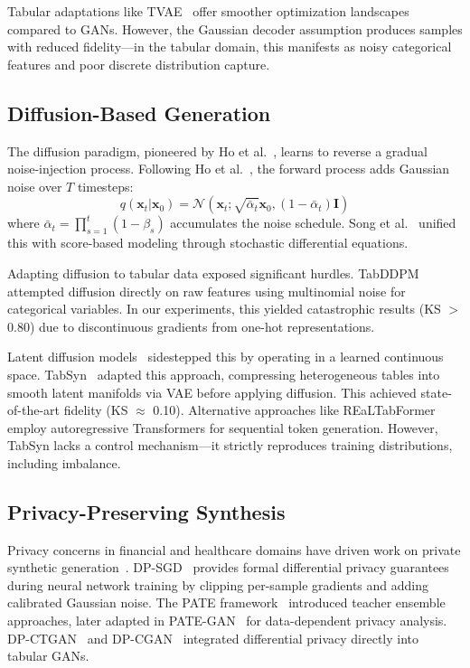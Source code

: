 \documentclass[conference]{IEEEtran}
\begin{document}
Tabular adaptations like TVAE~\cite{xu2019ctgan} offer smoother optimization landscapes compared to GANs. However, the Gaussian decoder assumption produces samples with reduced fidelity---in the tabular domain, this manifests as noisy categorical features and poor discrete distribution capture.

\subsection{Diffusion-Based Generation}
The diffusion paradigm, pioneered by Ho et al.~\cite{ho2020ddpm}, learns to reverse a gradual noise-injection process. Following Ho et al.~\cite{ho2020ddpm}, the forward process adds Gaussian noise over $T$ timesteps:
\begin{equation}
q(\mathbf{x}_t | \mathbf{x}_0) = \mathcal{N}(\mathbf{x}_t; \sqrt{\bar{\alpha}_t}\mathbf{x}_0, (1-\bar{\alpha}_t)\mathbf{I})
\end{equation}
where $\bar{\alpha}_t = \prod_{s=1}^t (1 - \beta_s)$ accumulates the noise schedule. Song et al.~\cite{song2021score} unified this with score-based modeling through stochastic differential equations.

Adapting diffusion to tabular data exposed significant hurdles. TabDDPM~\cite{kotelnikov2023tabddpm} attempted diffusion directly on raw features using multinomial noise for categorical variables. In our experiments, this yielded catastrophic results (KS $>$ 0.80) due to discontinuous gradients from one-hot representations.

Latent diffusion models~\cite{rombach2022ldm} sidestepped this by operating in a learned continuous space. TabSyn~\cite{zhang2024tabsyn} adapted this approach, compressing heterogeneous tables into smooth latent manifolds via VAE before applying diffusion. This achieved state-of-the-art fidelity (KS $\approx$ 0.10). Alternative approaches like REaLTabFormer~\cite{solatorio2023realtabformer} employ autoregressive Transformers for sequential token generation. However, TabSyn lacks a control mechanism---it strictly reproduces training distributions, including imbalance.

\subsection{Privacy-Preserving Synthesis}
Privacy concerns in financial and healthcare domains have driven work on private synthetic generation~\cite{yale2020synthetic}. DP-SGD~\cite{abadi2016dpsgd} provides formal differential privacy guarantees during neural network training by clipping per-sample gradients and adding calibrated Gaussian noise. The PATE framework~\cite{papernot2017pate} introduced teacher ensemble approaches, later adapted in PATE-GAN~\cite{jordon2019pategan} for data-dependent privacy analysis. DP-CTGAN~\cite{rosenblatt2020dpctgan} and DP-CGAN~\cite{torkzadehmahani2019dpctgan} integrated differential privacy directly into tabular GANs.
\end{document}
